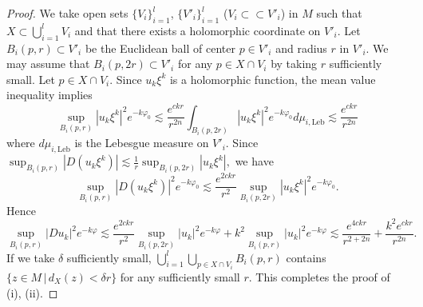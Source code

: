 \documentclass[12pt,oneside]{amsart}
\theoremstyle{plain}
\theoremstyle{definition}
\theoremstyle{remark}
\begin{document}
\begin{proof}
We take open sets $\{V_{i}\}_{i=1}^l$, $\{V'_{i}\}_{i=1}^l$ ($V_{i} \subset  \subset V'_{i}$) in $M$ such that $X \subset \bigcup_{i=1}^l V_{i}$ and that there exists a holomorphic coordinate on $V'_{i}$. 
Let $B_{i}(p, r) \subset V'_{i}$ be the Euclidean ball of center $p \in V'_{i}$ and radius $r$ in $V'_{i}$.  
We may assume that $B_{i}(p, 2r) \subset V'_{i}$ for any $p \in X \cap V_{i}$ by taking $r$ sufficiently small.  
Let $p \in X \cap V_{i}$.  
Since $u_{k}\xi^k$ is a holomorphic function, the mean value inequality implies 
\[
\sup_{B_{i}(p, r)} |u_{k}\xi^k|^2e^{-k\varphi_{0}} \lesssim \frac{e^{ckr}}{r^{2n}} \int_{B_{i}(p, 2r)} |u_{k}\xi^k|^2 e^{-k\varphi_{0}}d\mu_{i, \mathrm{Leb}} \lesssim \frac{e^{ckr}}{r^{2n}} 
\]
where $d\mu_{i, \mathrm{Leb}}$ is the Lebesgue measure on $V'_{i}$.  
Since 
$
\sup_{B_{i}(p, r)}|D(u_{k}\xi^k)| \lesssim \frac{1}{r} \sup_{B_{i}(p, 2r)} |u_{k}\xi^k|, 
$
we have 
\[
\sup_{B_{i}(p, r)}|D(u_{k} \xi^k)|^2 e^{-k\varphi_{0}} \lesssim  \frac{e^{2ckr}}{r^2} \sup_{B_{i}(p, 2r)}|u_{k}\xi^k|^2 e^{-k\varphi_{0}}.  
\]
Hence 
\[
\sup_{B_{i}(p, r)} |D u_{k}|^2 e^{-k\varphi} \lesssim \frac{e^{2ckr}}{r^{2}} \sup_{B_{i}(p, 2r)}|u_{k}|^2e^{-k\varphi}  + k^2 \sup_{B_{i}(p, r)}  |u_{k}|^2e^{-k\varphi} 
\lesssim \frac{e^{4ckr}}{r^{2+2n}} + \frac{k^2e^{ckr}}{r^{2n}}.  
\]
If we take $\delta$ sufficiently small, $\bigcup_{i=1}^l \bigcup_{p \in X \cap V_{i}} B_{i}(p, r)$ contains $\{z \in M\,|\, d_{X}(z) < \delta r \}$ for any sufficiently small $r$.  
This completes the proof of (i), (ii).  
\end{proof}
\end{document}
